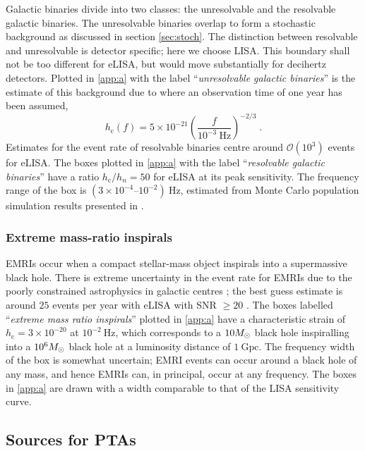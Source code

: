 Galactic binaries divide into two classes: the unresolvable and the resolvable galactic binaries. The unresolvable binaries overlap to form a stochastic background as discussed in section \ref{sec:stoch}. The distinction between resolvable and unresolvable is detector specific; here we choose LISA. This boundary shall not be too different for eLISA, but would move substantially for decihertz detectors. Plotted in \ref{app:a} with the label ``\emph{unresolvable galactic binaries}'' is the estimate of this background due to \citet{Nelemans} where an observation time of one year has been assumed,
\begin{equation}
h_\mathrm{c}(f)= 5\times 10^{-21} \left(\frac{f}{10^{-3}~\mathrm{Hz}}\right)^{-2/3} \; .
 \end{equation}
Estimates for the event rate of resolvable binaries centre around ${\mathcal{O}}(10^{3})$ events for eLISA. The boxes plotted in \ref{app:a} with the label ``\emph{resolvable galactic binaries}'' have a ratio $h_\mathrm{c}/h_{n}=50$ for eLISA at its peak sensitivity. The frequency range of the box is $\left(3\times10^{-4}\right.$--$\left.10^{-2}\right)~\mathrm{Hz}$, estimated from Monte Carlo population simulation results presented in \citet{Amaro-Seoane-et-al}.

\subsubsection{Extreme mass-ratio inspirals}

EMRIs occur when a compact stellar-mass object inspirals into a supermassive black hole. There is extreme uncertainty in the event rate for EMRIs due to the poorly constrained astrophysics in galactic centres \citep[e.g.,][]{Merritt2011}; the best guess estimate is around $25$ events per year with eLISA with SNR $\ge 20$ \citep{TheGravitationalUniverse}. The boxes labelled ``\emph{extreme mass ratio inspirals}'' plotted in \ref{app:a} have a characteristic strain of $h_\mathrm{c}=3\times 10^{-20}$ at $10^{-2}~\mathrm{Hz}$, which corresponds to a $10M_{ \odot }$ black hole inspiralling into a $10^{6}M_{ \odot }$ black hole at a luminosity distance of $1~\mathrm{Gpc}$. The frequency width of the box is somewhat uncertain; EMRI events can occur around a black hole of any mass, and hence EMRIs can, in principal, occur at any frequency. The boxes in \ref{app:a} are drawn with a width comparable to that of the LISA sensitivity curve.




\subsection{Sources for PTAs}

